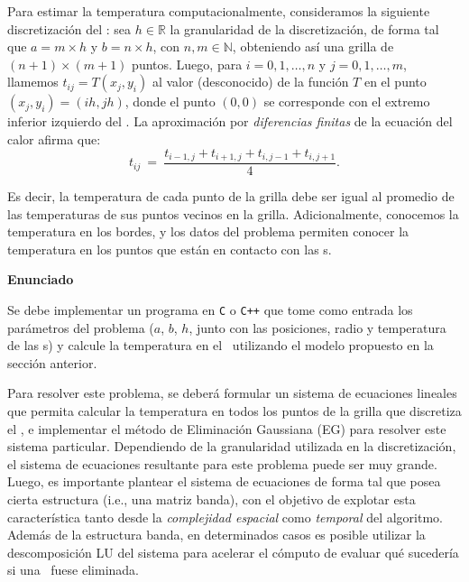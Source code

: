 Para estimar la temperatura computacionalmente, con\-si\-de\-ra\-mos la siguiente discretizaci\'on del \objeto: sea $h \in \mathbb{R}$ la granularidad de la discretizaci\'on, de forma tal que $a = m\times h$ y $b = n \times h$, con $n,m \in \mathbb{N}$, obteniendo as\'i una grilla de $(n+1)\times(m+1)$ puntos. Luego, para $i=0,1,\dots,n$ y $j=0,1,\dots,m$, llamemos $t_{ij} = T(x_j,y_i)$ al valor (desconocido) de la funci\'on $T$ en el punto $(x_j, y_i) = (ih, jh)$, donde el punto $(0,0)$ se corresponde con el extremo inferior izquierdo del \objeto.
La aproximaci\'on por \emph{diferencias finitas} de la ecuaci\'on del calor afirma que:
\begin{equation}
t_{ij} \ =\ \frac{ t_{i-1,j} + t_{i+1,j} + t_{i,j-1} + t_{i,j+1}}{4}.\label{eq:calordd}
\end{equation}

Es decir, la temperatura de cada punto de la grilla debe ser igual al promedio de las tem\-pe\-ra\-tu\-ras de sus puntos vecinos en la grilla. Adicionalmente, conocemos la temperatura en los bordes, y los datos del problema permiten conocer la temperatura en los puntos que est\'an en contacto con las \atacante s.

{\noindent \bf Enunciado}

Se debe implementar un programa en \verb+C+ o \verb-C++- que tome como entrada los par\'ametros del problema ($a$, $b$, $h$, junto con las posiciones, radio y temperatura de las \atacante s) y calcule la temperatura en el \objeto\ utilizando el modelo propuesto en la secci\'on anterior.

Para resolver este problema, se deber\'a formular un sistema de ecuaciones lineales que permita calcular la temperatura en todos los puntos de la grilla que discretiza el \objeto, e implementar el m\'etodo de Eliminaci\'on Gaussiana (EG) para resolver este sistema particular. Dependiendo de la granularidad utilizada en la discretizaci\'on, el sistema de ecuaciones resultante para este problema puede ser muy grande. Luego, es importante plantear el sistema de ecuaciones de forma tal que posea cierta estructura (i.e., una matriz banda), con el objetivo de explotar esta caracter\'istica tanto desde la \emph{complejidad espacial} como \emph{temporal} del algoritmo. Adem\'as de la estructura banda, en determinados casos es posible utilizar la descomposici\'on LU del sistema para acelerar el cómputo de evaluar qu\'e suceder\'ia si una \atacante\ fuese eliminada.

